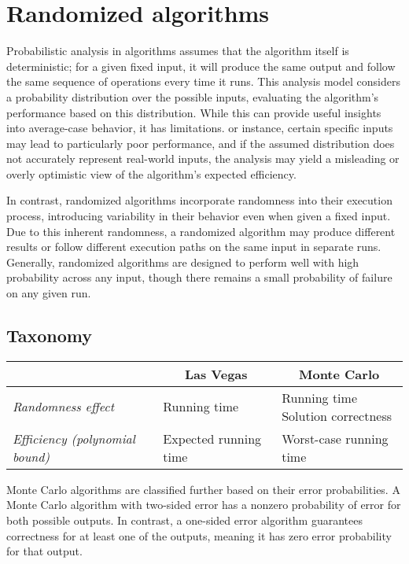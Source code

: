 \section{Randomized algorithms}

Probabilistic analysis in algorithms assumes that the algorithm itself is deterministic; for a given fixed input, it will produce the same output and follow the same sequence of operations every time it runs. 
This analysis model considers a probability distribution over the possible inputs, evaluating the algorithm's performance based on this distribution.
While this can provide useful insights into average-case behavior, it has limitations.
or instance, certain specific inputs may lead to particularly poor performance, and if the assumed distribution does not accurately represent real-world inputs, the analysis may yield a misleading or overly optimistic view of the algorithm's expected efficiency.

In contrast, randomized algorithms incorporate randomness into their execution process, introducing variability in their behavior even when given a fixed input.
Due to this inherent randomness, a randomized algorithm may produce different results or follow different execution paths on the same input in separate runs.
Generally, randomized algorithms are designed to perform well with high probability across any input, though there remains a small probability of failure on any given run.

\subsection{Taxonomy}
\renewcommand*{\arraystretch}{2}
\begin{table}[H]
    \centering
    \begin{tabular}{l|l|l|}
    \cline{2-3}
                                              & \multicolumn{1}{c|}{\textbf{Las Vegas}}                        & \multicolumn{1}{c|}{\textbf{Monte Carlo}}                         \\ \hline
    \multicolumn{1}{|l|}{\textit{Randomness effect}} & Running time                                      & \makecell[l]{Running time \\ Solution correctness}               \\ \hline
    \multicolumn{1}{|l|}{\textit{Efficiency (polynomial bound)}} & Expected running time & Worst-case running time  \\ \hline
    \end{tabular}
\end{table}
\renewcommand*{\arraystretch}{1}
Monte Carlo algorithms are classified further based on their error probabilities. 
A Monte Carlo algorithm with two-sided error has a nonzero probability of error for both possible outputs. 
In contrast, a one-sided error algorithm guarantees correctness for at least one of the outputs, meaning it has zero error probability for that output.